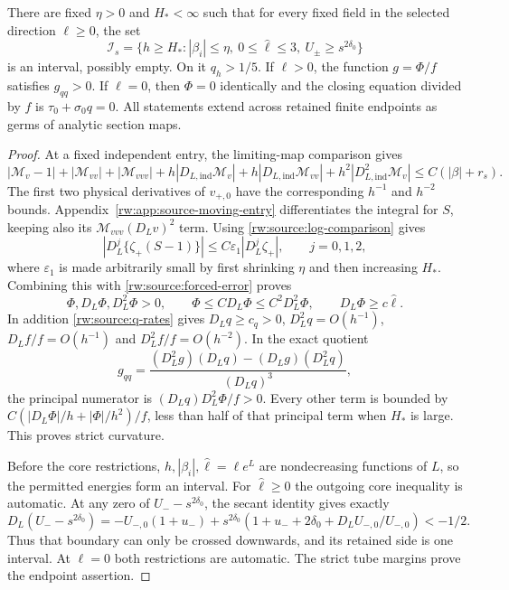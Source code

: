 \begin{proposition}
\label{rw:source:curvature}
There are fixed $\eta>0$ and $H_*<\infty$ such that for every
fixed field in the selected direction $\ell\ge0$, the set
\[
 \mathcal I_s=\{h\ge H_*: |\beta_i|\le\eta,
                  \ 0\le\widehat\ell\le3,
                  \ U_\pm\ge s^{2\delta_0}\}
\]
is an interval, possibly empty. On it $q_h>1/5$.
If $\ell>0$, the function $g=\Phi/f$ satisfies
$g_{qq}>0$. If $\ell=0$, then $\Phi=0$ identically and the
closing equation divided by $f$ is $\tau_0+\sigma_0q=0$.
All statements extend across retained finite endpoints as germs of
analytic section maps.
\end{proposition}
\begin{proof}
At a fixed independent entry, the limiting-map comparison gives
\[
 |\mathcal M_v-1|+|\mathcal M_{vv}|+|\mathcal M_{vvv}|
 +h|D_{L,\mathrm{ind}}\mathcal M_v|
 +h|D_{L,\mathrm{ind}}\mathcal M_{vv}|
 +h^2|D_{L,\mathrm{ind}}^2\mathcal M_v|
 \le C(|\beta|+r_s).
\]
The first two physical derivatives of $v_{+,0}$ have the
corresponding $h^{-1}$ and $h^{-2}$ bounds.
Appendix~\ref{rw:app:source-moving-entry} differentiates the integral
for $S$, keeping also its $\mathcal M_{vvv}(D_Lv)^2$ term.
Using \eqref{rw:source:log-comparison} gives
\[
 |D_L^j\{\zeta_+(S-1)\}|\le C\varepsilon_1
                         |D_L^j\zeta_+|,\qquad j=0,1,2,
\]
where $\varepsilon_1$ is made arbitrarily small by first shrinking
$\eta$ and then increasing $H_*$. Combining this with
\eqref{rw:source:forced-error} proves
\begin{equation}\label{rw:source:Phi-rates}
 \Phi,D_L\Phi,D_L^2\Phi>0,\qquad
 \Phi\le C D_L\Phi\le C^2D_L^2\Phi,
 \qquad D_L\Phi\ge c\widehat\ell.
\end{equation}
In addition \eqref{rw:source:q-rates} gives
$D_Lq\ge c_q>0$, $D_L^2q=O(h^{-1})$,
$D_Lf/f=O(h^{-1})$ and $D_L^2f/f=O(h^{-2})$.
In the exact quotient
\[
 g_{qq}=
 \frac{(D_L^2g)(D_Lq)-(D_Lg)(D_L^2q)}{(D_Lq)^3},
\]
the principal numerator is $(D_Lq)D_L^2\Phi/f>0$.
Every other term is bounded by
$C(|D_L\Phi|/h+|\Phi|/h^2)/f$, less than half of that principal
term when $H_*$ is large. This proves strict curvature.

Before the core restrictions, $h,|\beta_i|,\widehat\ell=\ell e^L$
are nondecreasing functions of $L$, so the permitted energies form
an interval. For $\widehat\ell\ge0$ the outgoing core inequality is
automatic. At any zero of $U_--s^{2\delta_0}$, the secant identity
gives exactly
\[
 D_L(U_--s^{2\delta_0})
 =-U_{-,0}(1+u_-)
 +s^{2\delta_0}\left(1+u_-+2\delta_0
                          +D_LU_{-,0}/U_{-,0}\right)<-1/2.
\]
Thus that boundary can only be crossed downwards, and its retained
side is one interval. At $\ell=0$ both restrictions are automatic.
The strict tube margins prove the endpoint assertion.
\end{proof}

